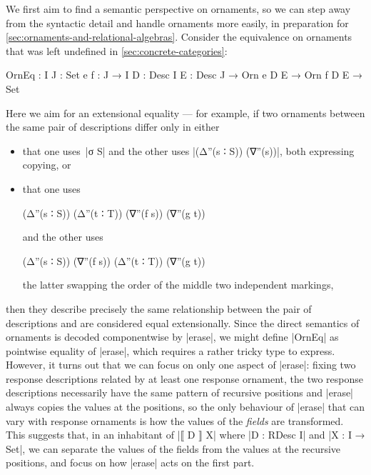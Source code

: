 We first aim to find a semantic perspective on ornaments, so we can step away from the syntactic detail and handle ornaments more easily, in preparation for \autoref{sec:ornaments-and-relational-algebras}.
Consider the equivalence on ornaments that was left undefined in \autoref{sec:concrete-categories}:
\begin{code}
OrnEq :  {I J : Set} {e f : J → I} {D : Desc I} {E : Desc J} →
         Orn e D E → Orn f D E → Set
\end{code}
Here we aim for an extensional equality --- for example, if two ornaments between the same pair of descriptions differ only in either
\begin{itemize}
\item that one uses~|σ S| and the other uses |(Δ''(s ∶ S)) (∇''(s))|, both expressing copying, or
\item that one uses
\begin{code}
(Δ''(s ∶ S)) (Δ''(t ∶ T)) (∇''(f s)) (∇''(g t))
\end{code}
and the other uses
\begin{code}
(Δ''(s ∶ S)) (∇''(f s)) (Δ''(t ∶ T)) (∇''(g t))
\end{code}
the latter swapping the order of the middle two independent markings,
\end{itemize}
then they describe precisely the same relationship between the pair of descriptions and are considered equal extensionally.
Since the direct semantics of ornaments is decoded componentwise by |erase|, we might define |OrnEq| as pointwise equality of |erase|, which requires a rather tricky type to express.
However, it turns out that we can focus on only one aspect of |erase|: fixing two response descriptions related by at least one response ornament, the two response descriptions necessarily have the same pattern of recursive positions and |erase| always copies the values at the positions, so the only behaviour of |erase| that can vary with response ornaments is how the values of the \emph{fields} are transformed.
This suggests that, in an inhabitant of |⟦ D ⟧ X| where |D : RDesc I| and |X : I → Set|, we can separate the values of the fields from the values at the recursive positions, and focus on how |erase| acts on the first part.

